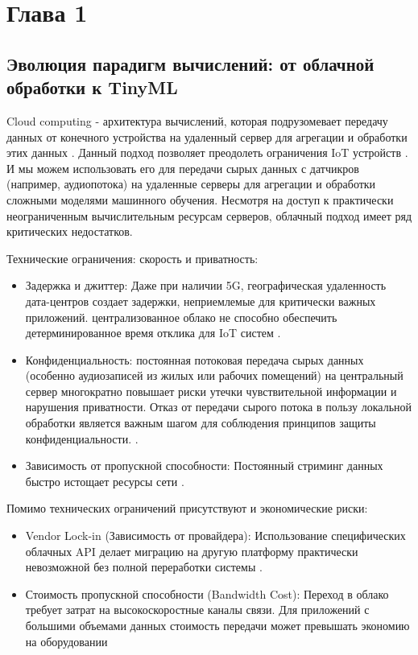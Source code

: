 \newpage

\chapter{Глава 1}
\section{Эволюция парадигм вычислений: от облачной обработки к TinyML}

Cloud computing - архитектура вычислений, которая подрузомевает передачу  данных от конечного устройства на удаленный сервер для агрегации и обработки этих данных \cite{Mell2011}. Данный подход позволяет преодолеть ограничения IoT устройств \cite{MohammedSadeeq2021}. И мы можем использовать его для передачи сырых  данных с датчикров (например, аудиопотока) на удаленные серверы для агрегации и обработки сложными моделями машинного обучения. Несмотря на доступ к практически неограниченным вычислительным ресурсам серверов, облачный подход имеет ряд критических недостатков.

Технические ограничения: скорость и приватность:
\begin{itemize}
    \item Задержка и джиттер: Даже при наличии 5G, географическая удаленность дата-центров создает задержки, неприемлемые для критически важных приложений. централизованное облако не способно обеспечить детерминированное время отклика для IoT систем \cite{Hazra2024}.
    \item Конфиденциальность: постоянная потоковая передача сырых данных (особенно аудиозаписей из жилых или рабочих помещений) на центральный сервер многократно повышает риски утечки чувствительной информации и нарушения приватности. Отказ от передачи сырого потока в пользу локальной обработки является важным шагом для соблюдения принципов защиты конфиденциальности. \cite{Li2019, Srinivas2025}. 
    \item Зависимость от пропускной способности: Постоянный стриминг данных быстро истощает ресурсы сети \cite{Aazam2014}.
\end{itemize}

Помимо технических ограничений присутствуют и экономические риски:
\begin{itemize}
    \item Vendor Lock-in (Зависимость от провайдера): Использование специфических облачных API делает миграцию на другую платформу практически невозможной без полной переработки системы \cite{OparaMartins2014}.
    \item Стоимость пропускной способности (Bandwidth Cost): Переход в облако требует затрат на высокоскоростные каналы связи. Для приложений с большими объемами данных стоимость передачи может превышать экономию на оборудовании \cite{Dillon2010}
\end{itemize}

